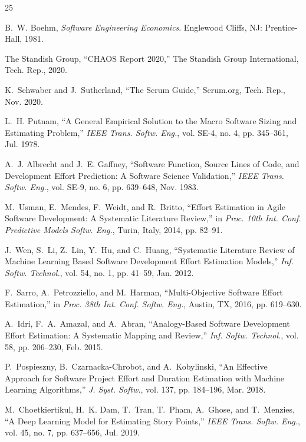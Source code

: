 \documentclass[conference]{IEEEtran}
\begin{document}
\begin{thebibliography}{25}

B.~W. Boehm, \textit{Software Engineering Economics}. Englewood Cliffs, NJ: Prentice-Hall, 1981.

The Standish Group, ``CHAOS Report 2020,'' The Standish Group International, Tech. Rep., 2020.

K.~Schwaber and J.~Sutherland, ``The Scrum Guide,'' Scrum.org, Tech. Rep., Nov. 2020.

L.~H. Putnam, ``A General Empirical Solution to the Macro Software Sizing and Estimating Problem,'' \textit{IEEE Trans. Softw. Eng.}, vol. SE-4, no. 4, pp. 345--361, Jul. 1978.

A.~J. Albrecht and J.~E. Gaffney, ``Software Function, Source Lines of Code, and Development Effort Prediction: A Software Science Validation,'' \textit{IEEE Trans. Softw. Eng.}, vol. SE-9, no. 6, pp. 639--648, Nov. 1983.

M.~Usman, E.~Mendes, F.~Weidt, and R.~Britto, ``Effort Estimation in Agile Software Development: A Systematic Literature Review,'' in \textit{Proc. 10th Int. Conf. Predictive Models Softw. Eng.}, Turin, Italy, 2014, pp. 82--91.

J.~Wen, S.~Li, Z.~Lin, Y.~Hu, and C.~Huang, ``Systematic Literature Review of Machine Learning Based Software Development Effort Estimation Models,'' \textit{Inf. Softw. Technol.}, vol. 54, no. 1, pp. 41--59, Jan. 2012.

F.~Sarro, A.~Petrozziello, and M.~Harman, ``Multi-Objective Software Effort Estimation,'' in \textit{Proc. 38th Int. Conf. Softw. Eng.}, Austin, TX, 2016, pp. 619--630.

A.~Idri, F.~A.~Amazal, and A.~Abran, ``Analogy-Based Software Development Effort Estimation: A Systematic Mapping and Review,'' \textit{Inf. Softw. Technol.}, vol. 58, pp. 206--230, Feb. 2015.

P.~Pospieszny, B.~Czarnacka-Chrobot, and A.~Kobylinski, ``An Effective Approach for Software Project Effort and Duration Estimation with Machine Learning Algorithms,'' \textit{J. Syst. Softw.}, vol. 137, pp. 184--196, Mar. 2018.

M.~Choetkiertikul, H.~K. Dam, T.~Tran, T.~Pham, A.~Ghose, and T.~Menzies, ``A Deep Learning Model for Estimating Story Points,'' \textit{IEEE Trans. Softw. Eng.}, vol. 45, no. 7, pp. 637--656, Jul. 2019.


\end{thebibliography}
\end{document}
